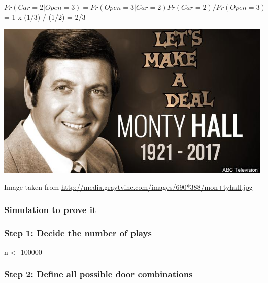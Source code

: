 \documentclass[
]{book}
\newenvironment{Shaded}{\begin{snugshade}}{\end{snugshade}}
\newcommand{\DecValTok}[1]{\textcolor[rgb]{0.00,0.00,0.81}{#1}}
\newcommand{\NormalTok}[1]{#1}
\newcommand{\OtherTok}[1]{\textcolor[rgb]{0.56,0.35,0.01}{#1}}
\begin{document}
\(Pr(Car=2|Open=3) = Pr(Open=3|Car=2)Pr(Car=2)/Pr(Open=3)\) = 1 x (1/3) / (1/2) = 2/3

\includegraphics[width=9.58in]{png/montyhall}

Image taken from \url{http://media.graytvinc.com/images/690*388/mon+tyhall.jpg}

\hypertarget{simulation-to-prove-it}{%
\subsubsection*{Simulation to prove it}\label{simulation-to-prove-it}}

\hypertarget{step-1-decide-the-number-of-plays}{%
\subsubsection*{Step 1: Decide the number of plays}\label{step-1-decide-the-number-of-plays}}

\begin{Shaded}
\begin{Highlighting}[]
\NormalTok{n }\OtherTok{\textless{}{-}} \DecValTok{100000}
\end{Highlighting}
\end{Shaded}

\hypertarget{step-2-define-all-possible-door-combinations}{%
\subsubsection*{Step 2: Define all possible door combinations}\label{step-2-define-all-possible-door-combinations}}
\end{document}
